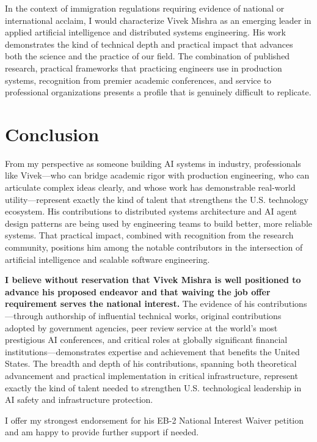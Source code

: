 \documentclass[11pt]{article}
\begin{document}
In the context of immigration regulations requiring evidence of national or international acclaim, I would characterize Vivek Mishra as an emerging leader in applied artificial intelligence and distributed systems engineering. His work demonstrates the kind of technical depth and practical impact that advances both the science and the practice of our field. The combination of published research, practical frameworks that practicing engineers use in production systems, recognition from premier academic conferences, and service to professional organizations presents a profile that is genuinely difficult to replicate.

\section*{Conclusion}

From my perspective as someone building AI systems in industry, professionals like Vivek---who can bridge academic rigor with production engineering, who can articulate complex ideas clearly, and whose work has demonstrable real-world utility---represent exactly the kind of talent that strengthens the U.S. technology ecosystem. His contributions to distributed systems architecture and AI agent design patterns are being used by engineering teams to build better, more reliable systems. That practical impact, combined with recognition from the research community, positions him among the notable contributors in the intersection of artificial intelligence and scalable software engineering.

\textbf{I believe without reservation that Vivek Mishra is well positioned to advance his proposed endeavor and that waiving the job offer requirement serves the national interest.} The evidence of his contributions---through authorship of influential technical works, original contributions adopted by government agencies, peer review service at the world's most prestigious AI conferences, and critical roles at globally significant financial institutions---demonstrates expertise and achievement that benefits the United States. The breadth and depth of his contributions, spanning both theoretical advancement and practical implementation in critical infrastructure, represent exactly the kind of talent needed to strengthen U.S. technological leadership in AI safety and infrastructure protection.

I offer my strongest endorsement for his EB-2 National Interest Waiver petition and am happy to provide further support if needed.
\end{document}
